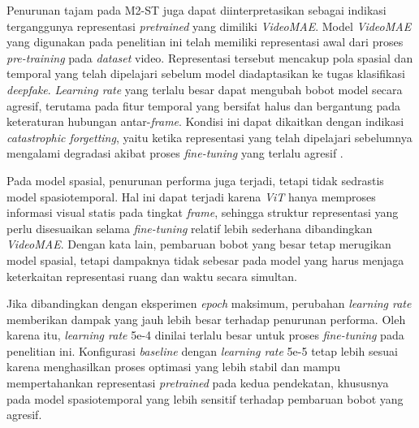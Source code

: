 Penurunan tajam pada M2-ST juga dapat diinterpretasikan sebagai indikasi terganggunya representasi \textit{pretrained} yang dimiliki \textit{VideoMAE}. Model \textit{VideoMAE} yang digunakan pada penelitian ini telah memiliki representasi awal dari proses \textit{pre-training} pada \textit{dataset} video. Representasi tersebut mencakup pola spasial dan temporal yang telah dipelajari sebelum model diadaptasikan ke tugas klasifikasi \textit{deepfake}. \textit{Learning rate} yang terlalu besar dapat mengubah bobot model secara agresif, terutama pada fitur temporal yang bersifat halus dan bergantung pada keteraturan hubungan antar-\textit{frame}. Kondisi ini dapat dikaitkan dengan indikasi \textit{catastrophic forgetting}, yaitu ketika representasi yang telah dipelajari sebelumnya mengalami degradasi akibat proses \textit{fine-tuning} yang terlalu agresif \cite{tong2022videomaemaskedautoencodersdataefficient,kirkpatrick2017overcomingcatastrophicforgetting}.

Pada model spasial, penurunan performa juga terjadi, tetapi tidak sedrastis model spasiotemporal. Hal ini dapat terjadi karena \textit{ViT} hanya memproses informasi visual statis pada tingkat \textit{frame}, sehingga struktur representasi yang perlu disesuaikan selama \textit{fine-tuning} relatif lebih sederhana dibandingkan \textit{VideoMAE}. Dengan kata lain, pembaruan bobot yang besar tetap merugikan model spasial, tetapi dampaknya tidak sebesar pada model yang harus menjaga keterkaitan representasi ruang dan waktu secara simultan.

Jika dibandingkan dengan eksperimen \textit{epoch} maksimum, perubahan \textit{learning rate} memberikan dampak yang jauh lebih besar terhadap penurunan performa. Oleh karena itu, \textit{learning rate} 5e-4 dinilai terlalu besar untuk proses \textit{fine-tuning} pada penelitian ini. Konfigurasi \textit{baseline} dengan \textit{learning rate} 5e-5 tetap lebih sesuai karena menghasilkan proses optimasi yang lebih stabil dan mampu mempertahankan representasi \textit{pretrained} pada kedua pendekatan, khususnya pada model spasiotemporal yang lebih sensitif terhadap pembaruan bobot yang agresif.

